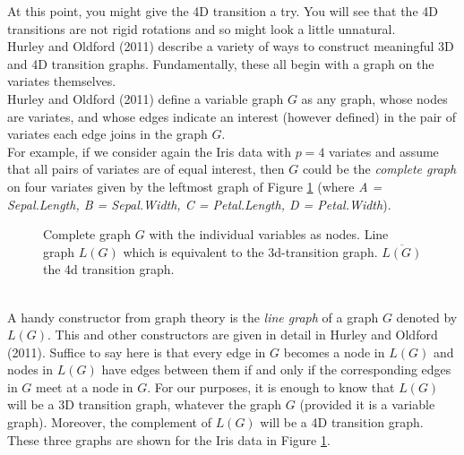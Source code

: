 \documentclass[12pt,oneside,titlepage,letter]{article}
\begin{document}
At this point, you might give the 4D transition a try.  You will see that the 4D transitions are not rigid rotations and so might look a little unnatural.\\

Hurley and Oldford (2011) describe a variety of ways to construct meaningful 3D and 4D transition graphs.  Fundamentally, these all begin with a graph on the variates themselves.\\

Hurley and Oldford (2011) define a variable graph $G$ as any graph, whose nodes are variates, and whose edges indicate an interest (however defined) in the pair of variates each edge joins in the graph $G$.\\

For example, if we consider again the Iris data with $p=4$ variates and assume that all pairs of variates are of equal interest, then $G$ could be the {\em complete graph} on four variates given by
the leftmost graph of Figure \ref{LLGLGNOT} (where \textit{A = Sepal.Length, B = Sepal.Width, C = Petal.Length, D = Petal.Width}).
\begin{figure}[h]
  \centering
  \caption{Complete graph $G$ with the individual variables as nodes. Line graph $L(G)$ which is equivalent to the 3d-transition graph. $\overline{L(G)}$ the 4d transition graph.}
  \label{LLGLGNOT}
\end{figure}
\\

A handy constructor from graph theory is the {\em line graph} of a graph $G$ denoted by $L(G)$.
This and other constructors are given in detail in Hurley and Oldford (2011).  Suffice to say here is that every edge in $G$ becomes a node in $L(G)$ and nodes in $L(G)$ have edges between them if and only if the corresponding edges in $G$ meet at a node in $G$.
For our purposes, it is enough to know that $L(G)$ will be a 3D transition graph, whatever the graph $G$ (provided it is a variable graph).  Moreover, the complement of $L(G)$ will be a 4D transition graph.  These three graphs are shown for the Iris data in Figure \ref{LLGLGNOT}.\\
\end{document}
